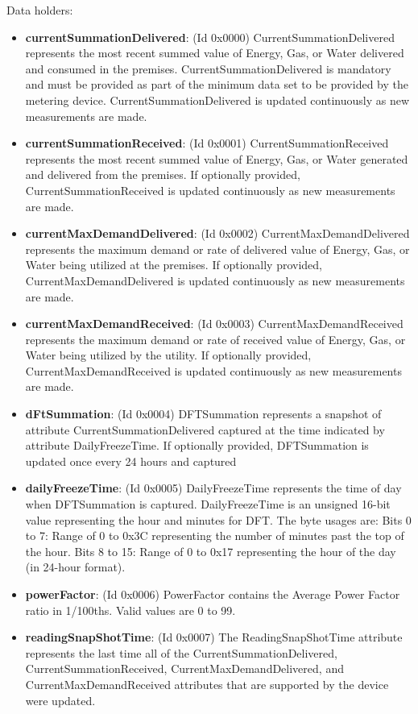 \noindent
Data holders:

\begin{itemize}
\item \textbf{currentSummationDelivered}: (Id 0x0000) CurrentSummationDelivered represents the most recent summed value of Energy, Gas, or Water delivered and consumed in the premises. CurrentSummationDelivered is mandatory and must be provided as part of the minimum data set to be provided by the metering device. CurrentSummationDelivered is updated continuously as new measurements are made.
\item \textbf{currentSummationReceived}: (Id 0x0001) CurrentSummationReceived represents the most recent summed value of Energy, Gas, or Water generated and delivered from the premises. If optionally provided, CurrentSummationReceived is updated continuously as new measurements are made.
\item \textbf{currentMaxDemandDelivered}: (Id 0x0002) CurrentMaxDemandDelivered represents the maximum demand or rate of delivered value of Energy, Gas, or Water being utilized at the premises. If optionally provided, CurrentMaxDemandDelivered is updated continuously as new measurements are made.
\item \textbf{currentMaxDemandReceived}: (Id 0x0003) CurrentMaxDemandReceived represents the maximum demand or rate of received value of Energy, Gas, or Water being utilized by the utility. If optionally provided, CurrentMaxDemandReceived is updated continuously as new measurements are made.
\item \textbf{dFtSummation}: (Id 0x0004) DFTSummation represents a snapshot of attribute CurrentSummationDelivered captured at the time indicated by attribute DailyFreezeTime. If optionally provided, DFTSummation is updated once every 24 hours and captured
\item \textbf{dailyFreezeTime}: (Id 0x0005) DailyFreezeTime represents the time of day when DFTSummation is captured. DailyFreezeTime is an unsigned 16-bit value representing the hour and minutes for DFT. The byte usages are: Bits 0 to 7: Range of 0 to 0x3C representing the number of minutes past the top of the hour. Bits 8 to 15: Range of 0 to 0x17 representing the hour of the day (in 24-hour format).
\item \textbf{powerFactor}: (Id 0x0006) PowerFactor contains the Average Power Factor ratio in 1/100ths. Valid values are 0 to 99.
\item \textbf{readingSnapShotTime}: (Id 0x0007) The ReadingSnapShotTime attribute represents the last time all of the CurrentSummationDelivered, CurrentSummationReceived, CurrentMaxDemandDelivered, and CurrentMaxDemandReceived attributes that are supported by the device were updated.

\end{itemize}
